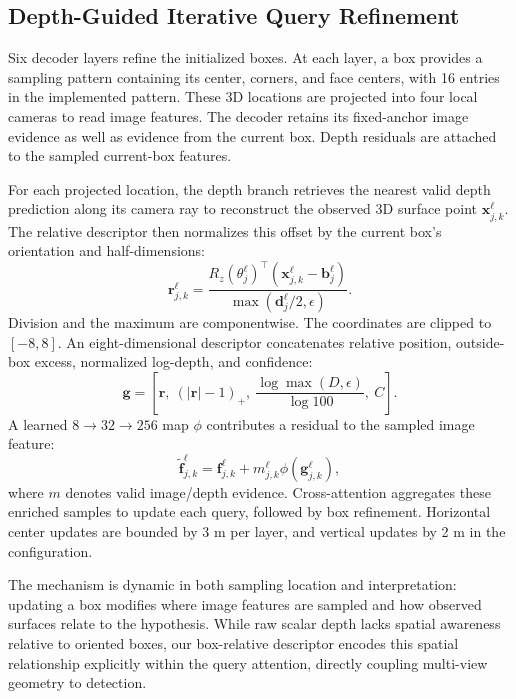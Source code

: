 \subsection{Depth-Guided Iterative Query Refinement}
Six decoder layers refine the initialized boxes. At each layer, a box provides a sampling pattern containing its center, corners, and face centers, with 16 entries in the implemented pattern. These 3D locations are projected into four local cameras to read image features. The decoder retains its fixed-anchor image evidence as well as evidence from the current box. Depth residuals are attached to the sampled current-box features.

For each projected location, the depth branch retrieves the nearest valid depth prediction along its camera ray to reconstruct the observed 3D surface point $\mathbf x_{j,k}^\ell$. The relative descriptor then normalizes this offset by the current box's orientation and half-dimensions:
\begin{equation}
 \mathbf r_{j,k}^\ell=
 \frac{R_z(\theta_j^\ell)^\top(\mathbf x_{j,k}^\ell-\mathbf b_j^\ell)}
 {\max(\mathbf d_j^\ell/2,\epsilon)}.
\end{equation}
Division and the maximum are componentwise. The coordinates are clipped to $[-8,8]$. An eight-dimensional descriptor concatenates relative position, outside-box excess, normalized log-depth, and confidence:
\begin{equation}
 \mathbf g=\left[\mathbf r,\ (|\mathbf r|-1)_+,\
 \frac{\log\max(D,\epsilon)}{\log100},\ C\right].
\end{equation}
A learned $8\!\rightarrow\!32\!\rightarrow\!256$ map $\phi$ contributes a residual to the sampled image feature:
\begin{equation}
 \widetilde{\mathbf f}_{j,k}^\ell=
 \mathbf f_{j,k}^\ell+m_{j,k}^\ell\phi(\mathbf g_{j,k}^\ell),
\end{equation}
where $m$ denotes valid image/depth evidence. Cross-attention aggregates these enriched samples to update each query, followed by box refinement. Horizontal center updates are bounded by 3 m per layer, and vertical updates by 2 m in the configuration.

The mechanism is dynamic in both sampling location and interpretation: updating a box modifies where image features are sampled and how observed surfaces relate to the hypothesis. While raw scalar depth lacks spatial awareness relative to oriented boxes, our box-relative descriptor encodes this spatial relationship explicitly within the query attention, directly coupling multi-view geometry to detection.

